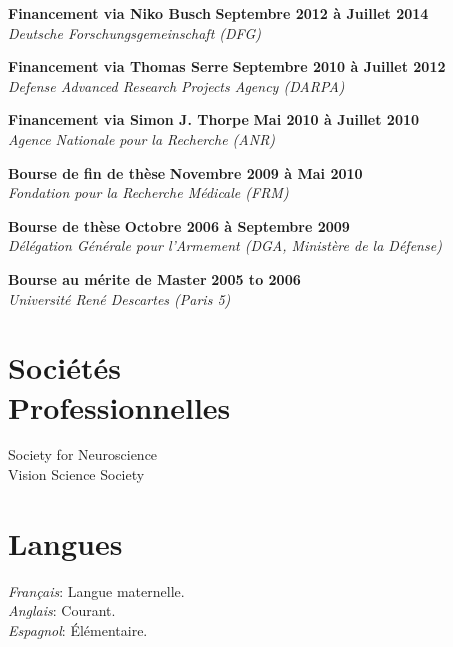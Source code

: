 \documentclass[margin,line]{resume}
\begin{document}
\begin{resume}
	\vspace{-2mm} 
	\textbf{Financement via Niko Busch} \hfill \textbf{Septembre 2012 à Juillet 2014}\\
	\textsl{Deutsche Forschungsgemeinschaft (DFG)}

	\vspace{-2mm} 
	\textbf{Financement via Thomas Serre} \hfill \textbf{Septembre 2010 à Juillet 2012}\\
	\textsl{Defense Advanced Research Projects Agency (DARPA)}

	\vspace{-2mm} 
	\textbf{Financement via Simon J. Thorpe} \hfill \textbf{Mai 2010 à Juillet 2010}\\
	\textsl{Agence Nationale pour la Recherche (ANR)}
		
	\vspace{-2mm} 
	\textbf{Bourse de fin de thèse} \hfill \textbf{Novembre 2009 à Mai 2010}\\
	\textsl{Fondation pour la Recherche Médicale (FRM)}
		
	\vspace{-2mm} 
	\textbf{Bourse de thèse} \hfill \textbf{Octobre 2006 à Septembre 2009}\\ %
	\textsl{Délégation Générale pour l'Armement (DGA, Ministère de la Défense)}
	
	\vspace{-2mm} 
	\textbf{Bourse au mérite  de Master} \hfill \textbf{2005 to 2006}\\
	\textsl{Université René Descartes (Paris 5)}	



\vspace{3mm}
\section{\mysidestyle Sociétés\\Professionnelles}
	Society for Neuroscience\\
	Vision Science Society

	
\vspace{3mm}
\section{\mysidestyle Langues}
	\textsl{Français}: Langue maternelle.\\
	\textsl{Anglais}: Courant.\\
	\textsl{Espagnol}: \'Elémentaire.


\end{resume}
\end{document}
